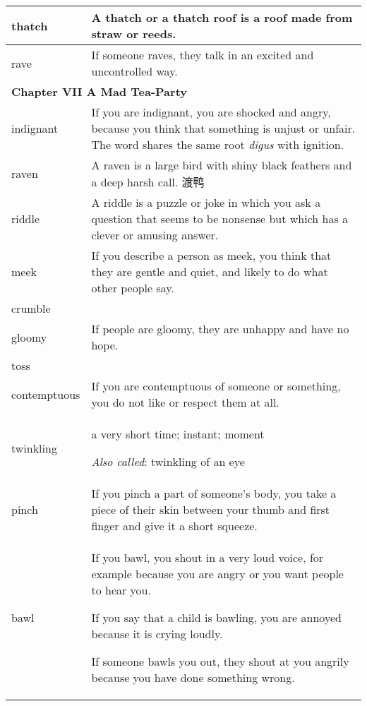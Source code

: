 \documentclass{article}
\begin{document}
\begin{center}
\begin{longtable}{|l|p{9cm}|}
\hline
thatch
&
A thatch or a thatch roof is a roof made from straw or reeds.
\\

\hline
rave
&
If someone raves, they talk in an excited and uncontrolled way.
\\

\hline
\multicolumn{2}{|l|}{\textbf{Chapter VII A Mad Tea-Party}}\\

\hline
indignant
&
If you are indignant, you are shocked and angry, because you think that something is unjust or unfair. The word shares the same root \textit{digus} with ignition.
\\

\hline
raven
&
A raven is a large bird with shiny black feathers and a deep harsh call. 渡鸭
\\

\hline
riddle
&
A riddle is a puzzle or joke in which you ask a question that seems to be nonsense but which has a clever or amusing answer.
\\

\hline
meek
&
If you describe a person as meek, you think that they are gentle and quiet, and likely to do what other people say.
\\

\hline
crumble
&

\\

\hline
gloomy
&
If people are gloomy, they are unhappy and have no hope.
\\

\hline
toss
&

\\

\hline
contemptuous
&
If you are contemptuous of someone or something, you do not like or respect them at all.
\\

\hline
twinkling
&
a very short time; instant; moment
\par
\textit{Also called}: twinkling of an eye
\\

\hline
pinch
&
If you pinch a part of someone's body, you take a piece of their skin between your thumb and first finger and give it a short squeeze.
\\

\hline
bawl
&
If you bawl, you shout in a very loud voice, for example because you are angry or you want people to hear you.
\par
If you say that a child is bawling, you are annoyed because it is crying loudly.
\par
If someone bawls you out, they shout at you angrily because you have done something wrong.
\\


\end{longtable}
\end{center}
\end{document}

